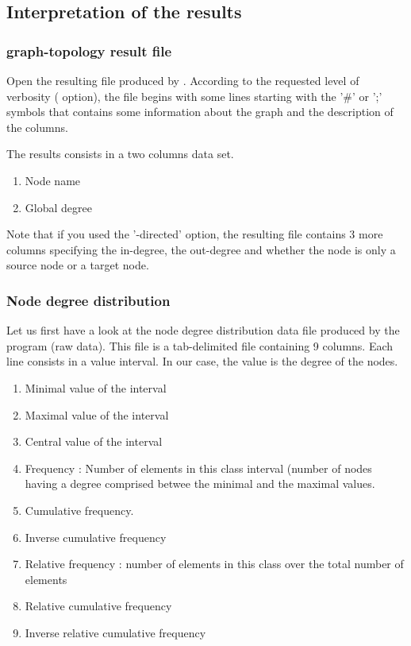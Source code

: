 \subsection{Interpretation of the results}

\subsubsection{graph-topology result file}

Open the resulting file produced by .
According to the requested level of verbosity ( option),
the file begins with some lines starting with the '\#' or ';' symbols
that contains some information about the graph and the description of
the columns.

The results consists in a two columns data set.
\begin{enumerate}
 \item Node name
 \item Global degree
\end{enumerate}

Note that if you used the '-directed' option, the resulting file
contains 3 more columns specifying the in-degree, the out-degree and
whether the node is only a source node or a target node.

\subsubsection{Node degree distribution}

Let us first have a look at the node degree distribution data file
produced by the  program (raw data).  This file is
a tab-delimited file containing 9 columns. Each line consists in a
value interval. In our case, the value is the degree of the nodes.

\begin{enumerate}
 \item Minimal value of the interval
 \item Maximal value of the interval
 \item Central value of the interval
 \item Frequency : Number of elements in this class interval (number
   of nodes having a degree comprised betwee the minimal and the
   maximal values.
 \item Cumulative frequency.
 \item Inverse cumulative frequency
 \item Relative frequency : number of elements in this class over the
   total number of elements
 \item Relative cumulative frequency
 \item Inverse relative cumulative frequency
\end{enumerate}

